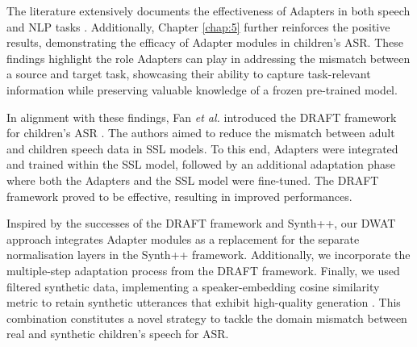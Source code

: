 The literature extensively documents the effectiveness of Adapters in both speech and \ac{NLP} tasks \cite{pfeiffer, philip2020monolingual, mao-etal-2022-unipelt}. Additionally, Chapter \ref{chap:5} further reinforces the positive results, demonstrating the efficacy of Adapter modules in children's \ac{ASR}. These findings highlight the role Adapters can play in addressing the mismatch between a source and target task, showcasing their ability to capture task-relevant information while preserving valuable knowledge of a frozen pre-trained model.

In alignment with these findings, Fan \textit{et al.} introduced the \ac{DRAFT} framework for children's \ac{ASR} \cite{fan2022draft}. The authors aimed to reduce the mismatch between adult and children speech data in \ac{SSL} models. To this end, Adapters were integrated and trained within the \ac{SSL} model, followed by an additional adaptation phase where both the Adapters and the \ac{SSL} model were fine-tuned. The \ac{DRAFT} framework proved to be effective, resulting in improved performances.


Inspired by the successes of the \ac{DRAFT} framework and Synth++, our \ac{DWAT} approach integrates Adapter modules as a replacement for the separate normalisation layers in the Synth++ framework. Additionally, we incorporate the multiple-step adaptation process from the \ac{DRAFT} framework. Finally, we used filtered synthetic data, implementing a speaker-embedding cosine similarity metric to retain synthetic utterances that exhibit high-quality generation \cite{wang2021towards}. This combination constitutes a novel strategy to tackle the domain mismatch between real and synthetic children's speech for \ac{ASR}.




